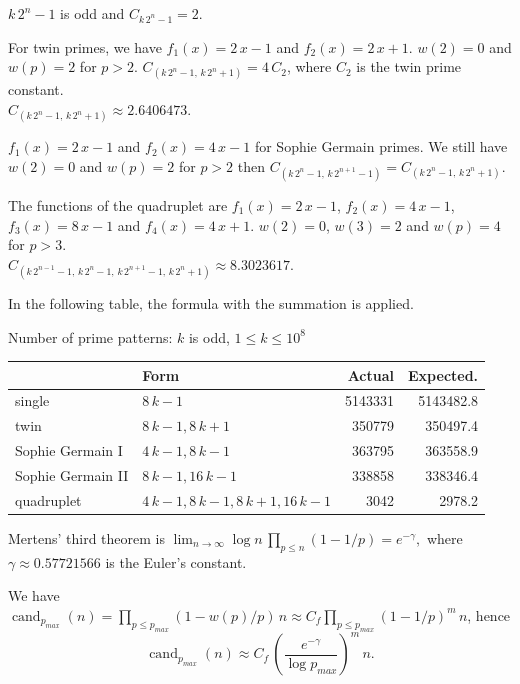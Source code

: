 \documentclass[a4paper, 12pt]{article}
\DeclareMathOperator{\cand}{cand}
\newcommand\T{\rule{0pt}{2.6ex}}
\theoremstyle{plain}
\theoremstyle{definition}
\begin{document}
\medskip

$k\,2^n - 1$ is odd and $C_{k\,2^n - 1} = 2$.

\medskip

For twin primes, we have $f_1(x) = 2\,x - 1$ and $f_2(x) = 2\,x + 1$. $w(2) = 0$ and
$w(p) = 2$ for $p > 2$. $C_{(k\,2^n - 1,\, k\,2^n + 1)} = 4\,C_2$, where $C_2$ is the
twin prime constant.\\
$C_{(k\,2^n - 1,\, k\,2^n + 1)} \approx 2.6406473$.

\medskip

$f_1(x) = 2\,x - 1$ and $f_2(x) = 4\,x - 1$ for Sophie Germain primes. We still have $w(2) = 0$ and
$w(p) = 2$ for $p > 2$ then  $C_{(k\,2^n - 1,\, k\,2^{n+1} - 1)} = C_{(k\,2^n - 1,\, k\,2^n + 1)}$.

\medskip

The functions of the quadruplet are $f_1(x) = 2\,x - 1$, $f_2(x) = 4\,x - 1$, $f_3(x) = 8\,x - 1$
and $f_4(x) = 4\,x + 1$. $w(2) = 0$, $w(3) = 2$ and $w(p) = 4$ for $p > 3$.\\
$C_{(k\,2^{n-1} - 1,\, k\,2^n - 1,\, k\,2^{n+1} - 1,\, k\,2^n + 1)} \approx 8.3023617$.

\medskip

In the following table, the formula with the summation is applied.
\begin{center}
Number of prime patterns: $k$ is odd, $1 \leq k \leq 10^8$
\smallskip

\begin{tabular}{llrr}
& Form & Actual & Expected.\\
\hline \T
single & $8\,k - 1$ & 5143331 & 5143482.8\\
twin & $8\,k - 1, 8\,k + 1$ & 350779 & 350497.4\\
Sophie Germain I & $4\,k - 1, 8\,k - 1$ & 363795 & 363558.9 \\
Sophie Germain II & $8\,k - 1, 16\,k - 1$ & 338858 & 338346.4\\
quadruplet & $4\,k - 1, 8\,k - 1, 8\,k + 1, 16\, k - 1$ & 3042 & 2978.2
\end{tabular}
\end{center}

\medskip

Mertens' third theorem is $\lim_{n \to \infty} \log n\, \prod_{p \leq n} \left(1 - 1/p\right)
= e^{-\gamma},$ where $\gamma \approx 0.57721566$ is the Euler's constant.

We have $\cand_{p_{max}}(n) = \prod_{p\leq p_{max}}\left(1 - w(p)/p\right)\,n
\approx C_f \prod_{p\leq p_{max}}\left(1 - 1/p\right)^m\,n$, hence
\[\cand_{p_{max}}(n) \approx C_f\, \left(\frac{e^{-\gamma}}{\log p_{max}}\right)^m\, n.\]
\end{document}

